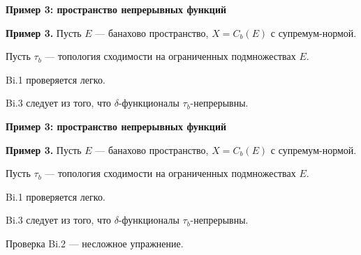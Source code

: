 \documentclass[11pt]{article}
\begin{document}
\begin{center}
{\color{notaeYELLOW}\bfseries\fontsize{44}{52}\selectfont Пример 3: пространство непрерывных функций}
\end{center}
\vspace*{\fill}
\begin{center}
\fontsize{36}{43}\selectfont
\parbox{\linewidth}{\centering\noindent \textbf{Пример 3.} Пусть $E$ --- банахово пространство, $X=C_b(E)$ с супремум-нормой.
\par}\vspace{0.4in}
\parbox{\linewidth}{\centering\noindent Пусть $\tau_b$ --- топология сходимости на ограниченных подмножествах $E$.
\par}\vspace{0.4in}
\parbox{\linewidth}{\centering\noindent Bi.1 проверяется легко.
\par}\vspace{0.4in}
\parbox{\linewidth}{\centering\noindent Bi.3 следует из того, что $\delta$-функционалы $\tau_b$-непрерывны.
\par}\vspace{0.4in}
\end{center}
\vspace*{\fill}

\newpage

\begin{center}
{\color{notaeYELLOW}\bfseries\fontsize{44}{52}\selectfont Пример 3: пространство непрерывных функций}
\end{center}
\vspace*{\fill}
\begin{center}
\fontsize{36}{43}\selectfont
\parbox{\linewidth}{\centering\noindent \textbf{Пример 3.} Пусть $E$ --- банахово пространство, $X=C_b(E)$ с супремум-нормой.
\par}\vspace{0.4in}
\parbox{\linewidth}{\centering\noindent Пусть $\tau_b$ --- топология сходимости на ограниченных подмножествах $E$.
\par}\vspace{0.4in}
\parbox{\linewidth}{\centering\noindent Bi.1 проверяется легко.
\par}\vspace{0.4in}
\parbox{\linewidth}{\centering\noindent Bi.3 следует из того, что $\delta$-функционалы $\tau_b$-непрерывны.
\par}\vspace{0.4in}
\parbox{\linewidth}{\centering\noindent Проверка Bi.2 --- несложное упражнение.
\par}\vspace{0.4in}
\end{center}
\vspace*{\fill}
\end{document}
